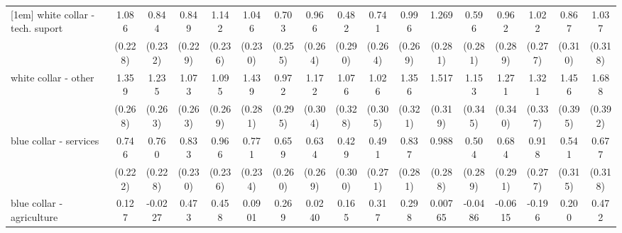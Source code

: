 {\begin{tabular}{l*{16}{c}}
[1em]
white collar - tech. suport&       1.086\sym{***}&       0.844\sym{***}&       0.849\sym{***}&       1.142\sym{***}&       1.046\sym{***}&       0.703\sym{**} &       0.966\sym{***}&       0.482         &       0.741\sym{**} &       0.996\sym{***}&       1.269\sym{***}&       0.596\sym{*}  &       0.962\sym{***}&       1.022\sym{***}&       0.867\sym{**} &       1.037\sym{**} \\
                    &     (0.228)         &     (0.232)         &     (0.229)         &     (0.236)         &     (0.230)         &     (0.255)         &     (0.264)         &     (0.290)         &     (0.264)         &     (0.269)         &     (0.281)         &     (0.281)         &     (0.289)         &     (0.277)         &     (0.310)         &     (0.318)         \\
[1em]
white collar - other&       1.359\sym{***}&       1.235\sym{***}&       1.073\sym{***}&       1.095\sym{***}&       1.439\sym{***}&       0.972\sym{***}&       1.172\sym{***}&       1.076\sym{**} &       1.026\sym{***}&       1.356\sym{***}&       1.517\sym{***}&       1.153\sym{***}&       1.271\sym{***}&       1.321\sym{***}&       1.456\sym{***}&       1.688\sym{***}\\
                    &     (0.268)         &     (0.263)         &     (0.263)         &     (0.269)         &     (0.281)         &     (0.295)         &     (0.304)         &     (0.328)         &     (0.305)         &     (0.321)         &     (0.319)         &     (0.345)         &     (0.340)         &     (0.337)         &     (0.395)         &     (0.392)         \\
[1em]
blue collar - services&       0.746\sym{***}&       0.760\sym{***}&       0.833\sym{***}&       0.966\sym{***}&       0.771\sym{***}&       0.659\sym{*}  &       0.634\sym{*}  &       0.429         &       0.491         &       0.837\sym{**} &       0.988\sym{***}&       0.504         &       0.684\sym{*}  &       0.918\sym{***}&       0.541         &       0.677\sym{*}  \\
                    &     (0.222)         &     (0.228)         &     (0.230)         &     (0.236)         &     (0.234)         &     (0.260)         &     (0.269)         &     (0.300)         &     (0.271)         &     (0.281)         &     (0.288)         &     (0.289)         &     (0.291)         &     (0.277)         &     (0.315)         &     (0.318)         \\
[1em]
blue collar - agriculture&       0.127         &     -0.0227         &       0.473         &       0.458         &      0.0901         &       0.269         &      0.0240         &       0.165         &       0.317         &       0.298         &     0.00765         &     -0.0486         &     -0.0615         &      -0.196         &       0.200         &       0.472         \\

\end{tabular}}
